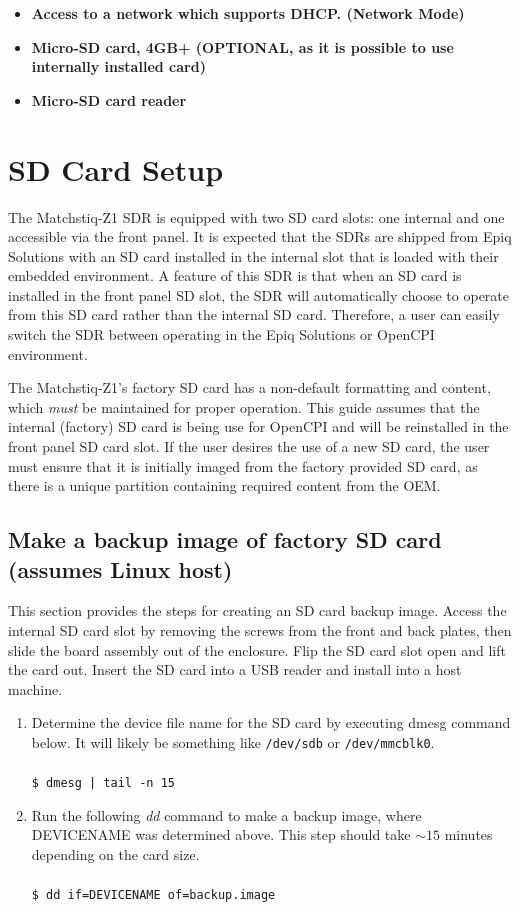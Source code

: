 \begin{flushleft}
\begin{itemize}
\item \textbf{Access to a network which supports DHCP. (Network Mode)}
\item \textbf{Micro-SD card, 4GB+ (OPTIONAL, as it is possible to use internally installed card) }
\item \textbf{Micro-SD card reader}
\end{itemize}
\end{flushleft}

\newpage
\section{SD Card Setup}
\label{sec:SD_Card_Setup}
The Matchstiq-Z1 SDR is equipped with two SD card slots: one internal and one accessible via the front panel. It is expected that the SDRs are shipped from Epiq Solutions with an SD card installed in the internal slot that is loaded with their embedded environment. A feature of this SDR is that when an SD card is installed in the front panel SD slot, the SDR will automatically choose to operate from this SD card rather than the internal SD card. Therefore, a user can easily switch the SDR between operating in the Epiq Solutions or OpenCPI environment.

The Matchstiq-Z1's factory SD card has a non-default formatting and content, which \textit{must} be maintained for proper operation. This guide assumes that the internal (factory) SD card is being use for OpenCPI and will be reinstalled in the front panel SD card slot. If the user desires the use of a new SD card, the user must ensure that it is initially imaged from the factory provided SD card, as there is a unique partition containing required content from the OEM.

\subsection{Make a backup image of factory SD card (assumes Linux host)}
This section provides the steps for creating an SD card backup image.  Access the internal SD card slot by removing the screws from the front and back plates, then slide the board assembly out of the enclosure. Flip the SD card slot open and lift the card out. Insert the SD card into a USB reader and install into a host machine.
\begin{enumerate}
	\item Determine the device file name for the SD card by
	executing dmesg command below. It will likely be something
	like \texttt{/dev/sdb} or \texttt{/dev/mmcblk0}.\\ \\
	\texttt{\$ dmesg | tail -n 15}
	\item Run the following \textit{dd} command to make a backup
	image, where DEVICENAME was determined above. This step
	should take $\sim15$ minutes depending on the card size.\\ \\
	\texttt{\$ dd if=DEVICENAME of=backup.image}
\end{enumerate}

